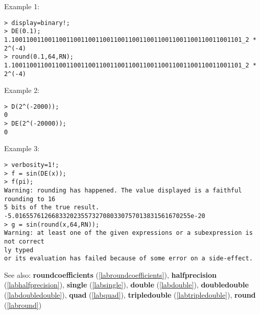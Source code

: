 \noindent Example 1: 
\begin{center}\begin{minipage}{15cm}\begin{Verbatim}[frame=single]
> display=binary!;
> DE(0.1);
1.100110011001100110011001100110011001100110011001100110011001101_2 * 2^(-4)
> round(0.1,64,RN);
1.100110011001100110011001100110011001100110011001100110011001101_2 * 2^(-4)
\end{Verbatim}
\end{minipage}\end{center}
\noindent Example 2: 
\begin{center}\begin{minipage}{15cm}\begin{Verbatim}[frame=single]
> D(2^(-2000));
0
> DE(2^(-20000));
0
\end{Verbatim}
\end{minipage}\end{center}
\noindent Example 3: 
\begin{center}\begin{minipage}{15cm}\begin{Verbatim}[frame=single]
> verbosity=1!;
> f = sin(DE(x));
> f(pi);
Warning: rounding has happened. The value displayed is a faithful rounding to 16
5 bits of the true result.
-5.016557612668332023557327080330757013831561670255e-20
> g = sin(round(x,64,RN));
Warning: at least one of the given expressions or a subexpression is not correct
ly typed
or its evaluation has failed because of some error on a side-effect.
\end{Verbatim}
\end{minipage}\end{center}
See also: \textbf{roundcoefficients} (\ref{labroundcoefficients}), \textbf{halfprecision} (\ref{labhalfprecision}), \textbf{single} (\ref{labsingle}), \textbf{double} (\ref{labdouble}), \textbf{doubledouble} (\ref{labdoubledouble}), \textbf{quad} (\ref{labquad}), \textbf{tripledouble} (\ref{labtripledouble}), \textbf{round} (\ref{labround})
